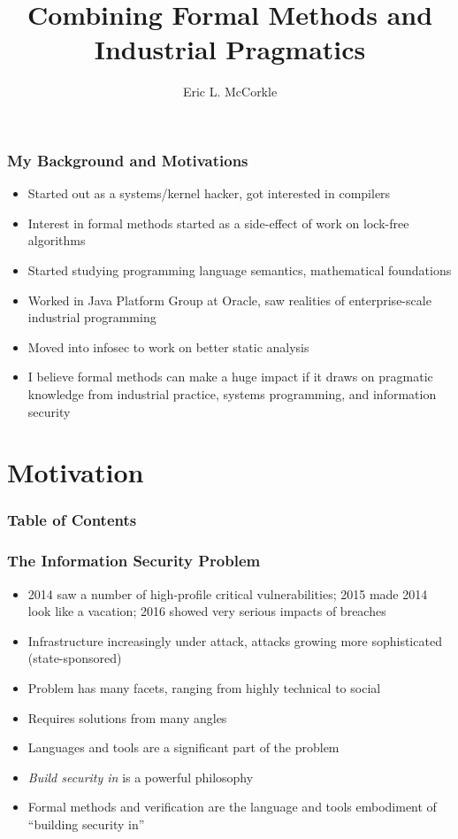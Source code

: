 \documentclass{beamer}
\title{Combining Formal Methods and Industrial Pragmatics}
\author{Eric L. McCorkle}
\begin{document}
\begin{frame}
  \titlepage
\end{frame}

\begin{frame}
  \frametitle{My Background and Motivations}
  \begin{itemize}
    \item Started out as a systems/kernel hacker, got interested in
      compilers
    \item Interest in formal methods started as a side-effect of work on
      lock-free algorithms
    \item Started studying programming language semantics,
      mathematical foundations
    \item Worked in Java Platform Group at Oracle, saw realities of
      enterprise-scale industrial programming
    \item Moved into infosec to work on better static analysis
    \item I believe formal methods can make a huge impact if it draws
      on pragmatic knowledge from industrial practice, systems
      programming, and information security
  \end{itemize}
\end{frame}

\section{Motivation}

\begin{frame}
  \frametitle{Table of Contents}
  \tableofcontents[currentsection]
\end{frame}

\begin{frame}
  \frametitle{The Information Security Problem}
  \begin{itemize}
    \item 2014 saw a number of high-profile critical vulnerabilities;
      2015 made 2014 look like a vacation; 2016 showed very serious
      impacts of breaches
    \item Infrastructure increasingly under attack, attacks growing
      more sophisticated (state-sponsored)
    \item Problem has many facets, ranging from highly technical to social
    \item Requires solutions from many angles
    \item Languages and tools are a significant part of the problem
    \item \emph{Build security in} is a powerful philosophy
    \item Formal methods and verification are the language and tools
      embodiment of ``building security in''
  \end{itemize}
\end{frame}
\end{document}

